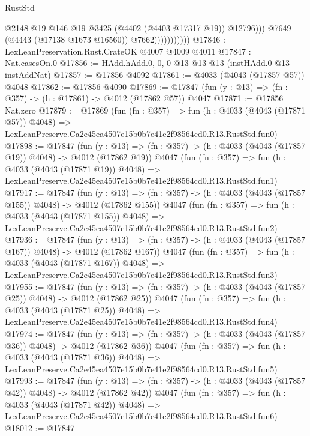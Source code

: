 \begin{lexlean}{RustStd}
\begin{coremodule}
                                @2148
                                @19
                                @146
                                @19
                                @3425
                                (@4402 (@4403 @17317 @19))
                                @12796)))
                          @7649
                          (@4443 (@17138 @1673 @16560))
                          @7662)))))))))))
@17846 := LexLeanPreservation.Rust.CrateOK @4007 @4009 @4011
@17847 := Nat.casesOn.{0}
@17856 := HAdd.hAdd.{0, 0, 0} @13 @13 @13 (instHAdd.{0} @13 instAddNat)
@17857 := @17856 @4092
@17861 := @4033 (@4043 (@17857 @57)) @4048
@17862 := @17856 @4090
@17869 := @17847 (fun (y : @13) => (fn : @357) -> (h : @17861) -> @4012 (@17862 @57)) @4047
@17871 := @17856 Nat.zero
@17879 := @17869
    (fun (fn : @357) =>
    fun (h : @4033 (@4043 (@17871 @57)) @4048) =>
    LexLeanPreserve.Ca2e45ea4507e15b0b7e41e2f98564cd0.R13.RustStd.fun0)
@17898 := @17847
    (fun (y : @13) => (fn : @357) -> (h : @4033 (@4043 (@17857 @19)) @4048) -> @4012 (@17862 @19))
    @4047
    (fun (fn : @357) =>
    fun (h : @4033 (@4043 (@17871 @19)) @4048) =>
    LexLeanPreserve.Ca2e45ea4507e15b0b7e41e2f98564cd0.R13.RustStd.fun1)
@17917 := @17847
    (fun (y : @13) => (fn : @357) -> (h : @4033 (@4043 (@17857 @155)) @4048) -> @4012 (@17862 @155))
    @4047
    (fun (fn : @357) =>
    fun (h : @4033 (@4043 (@17871 @155)) @4048) =>
    LexLeanPreserve.Ca2e45ea4507e15b0b7e41e2f98564cd0.R13.RustStd.fun2)
@17936 := @17847
    (fun (y : @13) => (fn : @357) -> (h : @4033 (@4043 (@17857 @167)) @4048) -> @4012 (@17862 @167))
    @4047
    (fun (fn : @357) =>
    fun (h : @4033 (@4043 (@17871 @167)) @4048) =>
    LexLeanPreserve.Ca2e45ea4507e15b0b7e41e2f98564cd0.R13.RustStd.fun3)
@17955 := @17847
    (fun (y : @13) => (fn : @357) -> (h : @4033 (@4043 (@17857 @25)) @4048) -> @4012 (@17862 @25))
    @4047
    (fun (fn : @357) =>
    fun (h : @4033 (@4043 (@17871 @25)) @4048) =>
    LexLeanPreserve.Ca2e45ea4507e15b0b7e41e2f98564cd0.R13.RustStd.fun4)
@17974 := @17847
    (fun (y : @13) => (fn : @357) -> (h : @4033 (@4043 (@17857 @36)) @4048) -> @4012 (@17862 @36))
    @4047
    (fun (fn : @357) =>
    fun (h : @4033 (@4043 (@17871 @36)) @4048) =>
    LexLeanPreserve.Ca2e45ea4507e15b0b7e41e2f98564cd0.R13.RustStd.fun5)
@17993 := @17847
    (fun (y : @13) => (fn : @357) -> (h : @4033 (@4043 (@17857 @42)) @4048) -> @4012 (@17862 @42))
    @4047
    (fun (fn : @357) =>
    fun (h : @4033 (@4043 (@17871 @42)) @4048) =>
    LexLeanPreserve.Ca2e45ea4507e15b0b7e41e2f98564cd0.R13.RustStd.fun6)
@18012 := @17847

\end{coremodule}
\end{lexlean}
